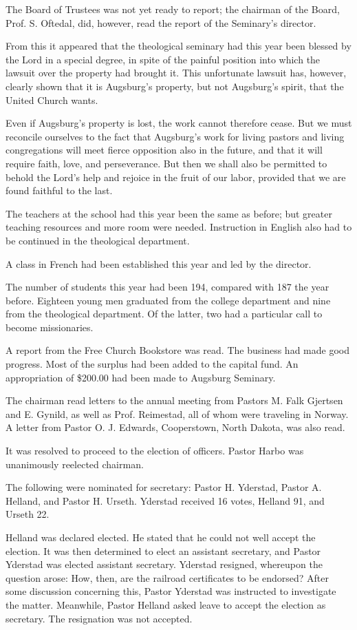 The Board of Trustees was not yet ready to report; the chairman of the Board, Prof. S. Oftedal, did, however, read the report of the Seminary’s director.

From this it appeared that the theological seminary had this year been blessed by the Lord in a special degree, in spite of the painful position into which the lawsuit over the property had brought it. This unfortunate lawsuit has, however, clearly shown that it is Augsburg’s property, but not Augsburg’s spirit, that the United Church wants.

Even if Augsburg’s property is lost, the work cannot therefore cease. But we must reconcile ourselves to the fact that Augsburg’s work for living pastors and living congregations will meet fierce opposition also in the future, and that it will require faith, love, and perseverance. But then we shall also be permitted to behold the Lord’s help and rejoice in the fruit of our labor, provided that we are found faithful to the last.

The teachers at the school had this year been the same as before; but greater teaching resources and more room were needed. Instruction in English also had to be continued in the theological department.

A class in French had been established this year and led by the director.

The number of students this year had been 194, compared with 187 the year before. Eighteen young men graduated from the college department and nine from the theological department. Of the latter, two had a particular call to become missionaries.

A report from the Free Church Bookstore was read. The business had made good progress. Most of the surplus had been added to the capital fund. An appropriation of \$200.00 had been made to Augsburg Seminary.

The chairman read letters to the annual meeting from Pastors M. Falk Gjertsen and E. Gynild, as well as Prof. Reimestad, all of whom were traveling in Norway. A letter from Pastor O. J. Edwards, Cooperstown, North Dakota, was also read.

It was resolved to proceed to the election of officers. Pastor Harbo was unanimously reelected chairman.

The following were nominated for secretary: Pastor H. Yderstad, Pastor A. Helland, and Pastor H. Urseth. Yderstad received 16 votes, Helland 91, and Urseth 22.

Helland was declared elected. He stated that he could not well accept the election. It was then determined to elect an assistant secretary, and Pastor Yderstad was elected assistant secretary. Yderstad resigned, whereupon the question arose: How, then, are the railroad certificates to be endorsed? After some discussion concerning this, Pastor Yderstad was instructed to investigate the matter. Meanwhile, Pastor Helland asked leave to accept the election as secretary. The resignation was not accepted.


